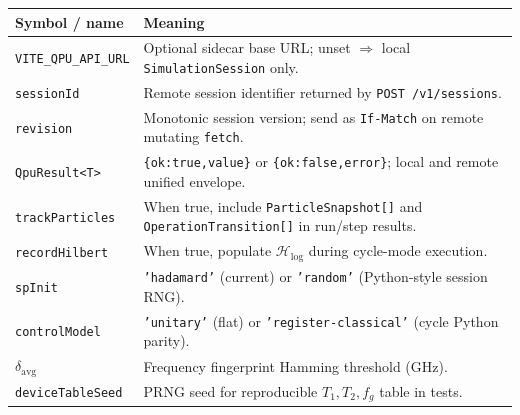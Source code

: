 \documentclass[11pt,a4paper]{article}
\newcommand{\HS}{\mathcal{H}_{\mathrm{log}}}
\begin{document}
\begin{center}
\small
\begin{tabular}{@{}p{2.8cm}p{10.5cm}@{}}
\toprule
Symbol / name & Meaning \\
\midrule
\texttt{VITE\_QPU\_API\_URL} & Optional sidecar base URL; unset $\Rightarrow$ local \texttt{SimulationSession} only. \\
\texttt{sessionId} & Remote session identifier returned by \texttt{POST /v1/sessions}. \\
\texttt{revision} & Monotonic session version; send as \texttt{If-Match} on remote mutating \texttt{fetch}. \\
\texttt{QpuResult<T>} & \texttt{\{ok:true,value\}} or \texttt{\{ok:false,error\}}; local and remote unified envelope. \\
\texttt{trackParticles} & When true, include \texttt{ParticleSnapshot[]} and \texttt{OperationTransition[]} in run/step results. \\
\texttt{recordHilbert} & When true, populate $\HS$ during cycle-mode execution. \\
\texttt{spInit} & \texttt{'hadamard'} (current) or \texttt{'random'} (Python-style session RNG). \\
\texttt{controlModel} & \texttt{'unitary'} (flat) or \texttt{'register-classical'} (cycle Python parity). \\
$\delta_{\mathrm{avg}}$ & Frequency fingerprint Hamming threshold (GHz). \\
\texttt{deviceTableSeed} & PRNG seed for reproducible $T_1,T_2,f_g$ table in tests. \\
\bottomrule
\end{tabular}
\end{center}
\end{document}
